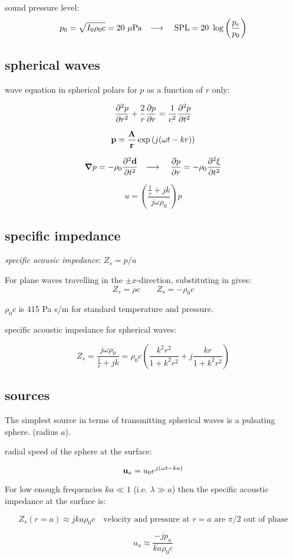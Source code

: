 \documentclass[10pt, a4paper, twocolumn]{article}
\newcommand{\deff}[1]{\par \noindent \textit{#1}: }
\newcommand{\arr}{\ensuremath{\longrightarrow\ }}
\begin{document}
sound pressure level:
\[p_0 = \sqrt{I_0\rho _0c} = 20\ \mu\text{Pa}
\qq{\arr} \text{SPL}=20\ \log\qty(\frac{p_e}{p_0}) \]

\subsection{spherical waves}

wave equation in spherical polars for $p$ as a function of $r$ only:

\[\pdv[2]{p}{r}+\frac2r\pdv{p}{r} = \frac{1}{c^2}\pdv[2]{p}{t} \]

\[\vb p = \frac{\vb A}{\vb r}
\exp\qty(j(\omega t - kr)) \]

\[\grad p = -\rho _0\pdv[2]{\vb d}{t}
\qq{\arr} \pdv{p}{r} = -\rho _0\pdv[2]{\xi}{t} \]

\[u=\left( \frac{\frac1r+jk}{j\omega \rho _0} \right)p\]

\subsection{specific impedance}

\deff{specific acousic impedance}
$Z_s = p/u$

For plane waves travelling in the $\pm x$-direction, substituting in gives:
\[ Z_s = \rho c \qquad Z_s = -\rho _0 c \]

$\rho _0c$ is 415 Pa s/m for standard temperature and pressure.

specific acoustic impedance for spherical waves:

\[Z_s = \frac{j\omega \rho _0}{\frac1r+jk}
= \rho _0c \left(\frac{k^2r^2}{1+k^2r^2}
+j\frac{kr}{1+k^2r^2} \right) \]

\subsection{sources}

The simplest source in terms of transmitting spherical waves is a pulsating sphere. (radius $a$).

radial speed of the sphere at the surface:

\[\vb u _a = u_0 e^{j(\omega t-ka)} \]

For low enough frequencies $ka \ll 1$ (i.e. $\lambda \gg a$) then the specific acoustic impedance at the surface is:

\[Z_s(r=a) \approx jka\rho _0 c
\quad\text{velocity and pressure at $r=a$ are $\pi/2$ out of phase}
\]

\[u_a \approx \frac{-jp_a}{ka\rho _0c} \]
\end{document}
